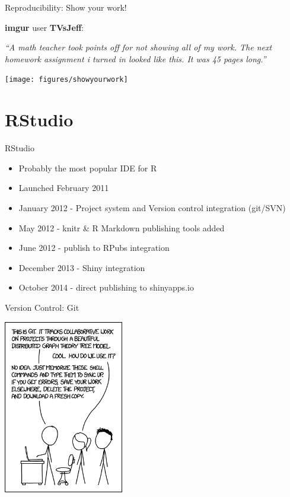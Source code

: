 \documentclass[handout]{beamer}
\begin{document}
\begin{frame}{Reproducibility: Show your work!}
    \begin{minipage}{.45\textwidth}
\small{
\vspace{0.5cm}

\textbf{imgur} user \textbf{TVsJeff}: 
\vspace{0.5cm}

\emph{``A math teacher took points off for not showing all of my work. The next homework assignment i turned in looked like this. It was 45 pages long.''}}
    \end{minipage}\hfill
    \begin{minipage}{.5\textwidth}
\texttt{[image: figures/showyourwork]}
    \end{minipage}
  
\end{frame}

\section{RStudio}
\begin{frame}{RStudio}
\begin{itemize}
\item Probably the most popular IDE for R
\item Launched February 2011
\item January 2012 - Project system and Version control integration (git/SVN)
\item May 2012 - knitr \& R Markdown publishing tools added
\item June 2012 - publish to RPubs integration
\item December 2013 - Shiny integration
\item October 2014 - direct publishing to shinyapps.io
\end{itemize}
\end{frame}

\begin{frame}{Version Control: Git}

\includegraphics[height=7.6cm]{figures/git}
\end{frame}
\end{document}
